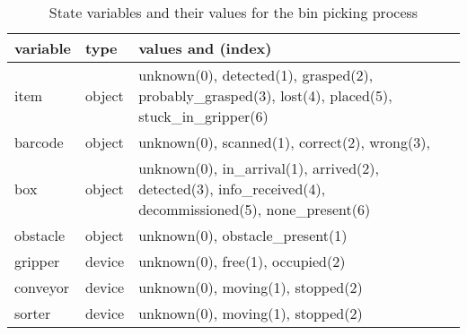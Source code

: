 \documentclass[12pt]{article}
\begin{document}
\begin{table}[]
	\caption{State variables and their values for the bin picking process}
	\label{tab:state_variables}
	\begin{tabularx}{\textwidth}{llp{}}
		variable                                   & type & values and (index)                                                                                                                                                           \\ \hline
		item                                       & object     & unknown(0), detected(1), grasped(2), probably\_grasped(3), lost(4), placed(5), stuck\_in\_gripper(6)                                                           \\
		barcode                                    & object     & unknown(0), scanned(1), correct(2), wrong(3),                                                                                                                                 \\
		box                                        & object     & unknown(0), in\_arrival(1), arrived(2), detected(3), info\_received(4), decommissioned(5), none\_present(6)                                                                           \\
		obstacle                                   & object     & unknown(0), obstacle\_present(1)                                                                                                                                        \\
		gripper                                    & device     & unknown(0), free(1), occupied(2)                                                                                                                                           \\
		conveyor                                   & device     & unknown(0), moving(1), stopped(2)                                                                                                                                          \\
		sorter                                     & device     & unknown(0), moving(1), stopped(2)                                                                                                                                          \\

\end{tabularx}
\end{table}
\end{document}

